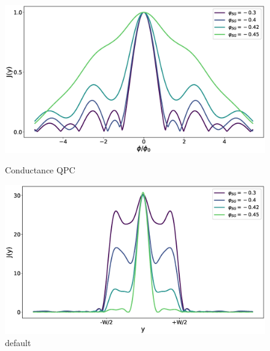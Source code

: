 \begin{figure}[ht]
\begin{minipage}[b]{0.5\linewidth}
\centering
\includegraphics[width=\textwidth]{figure/numericalmodel/waveguide-ic}
\caption{Conductance QPC} \label{fig:qpc-conductance}
\end{minipage}
\begin{minipage}[b]{0.5\linewidth}
\centering
\includegraphics[width=\textwidth]{figure/numericalmodel/waveguide-jy}
\caption{default}\label{fig:qpc-conductance-sigma}
\end{minipage}
\end{figure}

